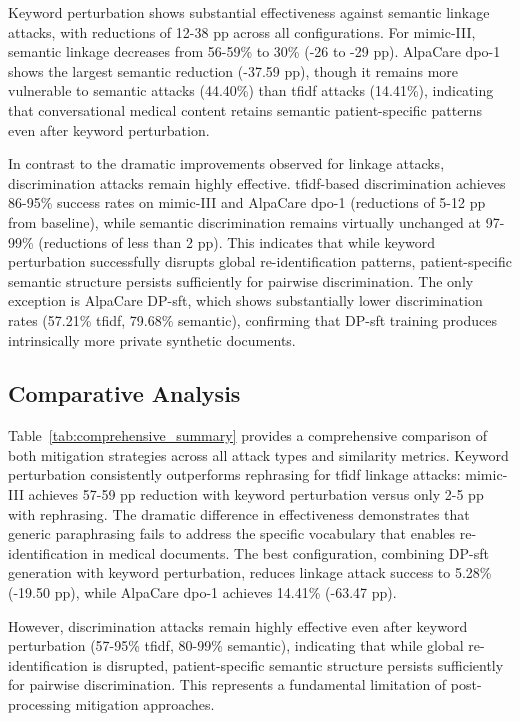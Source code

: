 Keyword perturbation shows substantial effectiveness against semantic linkage attacks, with reductions of 12-38 pp across all configurations. For \gls{mimic}-III, semantic linkage decreases from 56-59\% to 30\% (-26 to -29 pp). AlpaCare \gls{dpo}-1 shows the largest semantic reduction (-37.59 pp), though it remains more vulnerable to semantic attacks (44.40\%) than \gls{tfidf} attacks (14.41\%), indicating that conversational medical content retains semantic patient-specific patterns even after keyword perturbation.

In contrast to the dramatic improvements observed for linkage attacks, discrimination attacks remain highly effective. \gls{tfidf}-based discrimination achieves 86-95\% success rates on \gls{mimic}-III and AlpaCare \gls{dpo}-1 (reductions of 5-12 pp from baseline), while semantic discrimination remains virtually unchanged at 97-99\% (reductions of less than 2 pp). This indicates that while keyword perturbation successfully disrupts global re-identification patterns, patient-specific semantic structure persists sufficiently for pairwise discrimination. The only exception is AlpaCare DP-\gls{sft}, which shows substantially lower discrimination rates (57.21\% \gls{tfidf}, 79.68\% semantic), confirming that DP-\gls{sft} training produces intrinsically more private synthetic documents.

\subsection{Comparative Analysis}
\label{subsec:mitigation_comparison}

Table~\ref{tab:comprehensive_summary} provides a comprehensive comparison of both mitigation strategies across all attack types and similarity metrics. Keyword perturbation consistently outperforms rephrasing for \gls{tfidf} linkage attacks: \gls{mimic}-III achieves 57-59 pp reduction with keyword perturbation versus only 2-5 pp with rephrasing. The dramatic difference in effectiveness demonstrates that generic paraphrasing fails to address the specific vocabulary that enables re-identification in medical documents. The best configuration, combining DP-\gls{sft} generation with keyword perturbation, reduces linkage attack success to 5.28\% (-19.50 pp), while AlpaCare \gls{dpo}-1 achieves 14.41\% (-63.47 pp).

However, discrimination attacks remain highly effective even after keyword perturbation (57-95\% \gls{tfidf}, 80-99\% semantic), indicating that while global re-identification is disrupted, patient-specific semantic structure persists sufficiently for pairwise discrimination. This represents a fundamental limitation of post-processing mitigation approaches.

